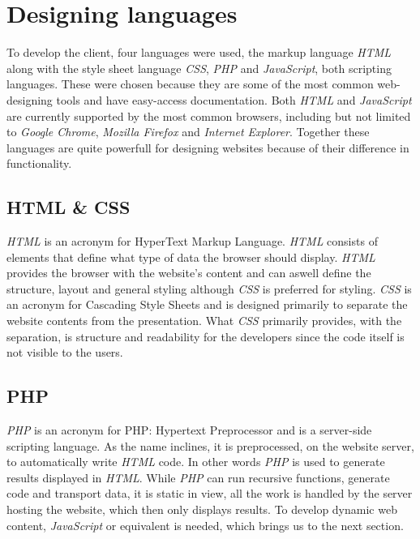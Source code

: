 \section{Designing languages}
To develop the client, four languages were used, the markup language \textit{HTML} along with the style sheet language \textit{CSS}, \textit{PHP} and \textit{JavaScript}, both scripting languages. These were chosen because they are some of the most common web-designing tools and have easy-access documentation. Both \textit{HTML} and \textit{JavaScript} are currently supported by the most common browsers, including but not limited to \textit{Google Chrome}, \textit{Mozilla Firefox} and \textit{Internet Explorer}.
Together these languages are quite powerfull for designing websites because of their difference in functionality.

\subsection{HTML \& CSS}
\label{program_tools_html_css}
\textit{HTML} is an acronym for HyperText Markup Language. \textit{HTML} consists of elements that define what type of data the browser should display. \textit{HTML} provides the browser with the website's content and can aswell define the structure, layout and general styling although \textit{CSS} is preferred for styling. \textit{CSS} is an acronym for Cascading Style Sheets and is designed primarily to separate the website contents from the presentation.
What \textit{CSS} primarily provides, with the separation, is structure and readability for the developers since the code itself is not visible to the users.\cite{html}\cite{css}

\subsection{PHP}
\textit{PHP} is an acronym for PHP: Hypertext Preprocessor and is a server-side scripting language. As the name inclines, it is preprocessed, on the website server, to automatically write \textit{HTML} code. In other words \textit{PHP} is used to generate results displayed in \textit{HTML}. While \textit{PHP} can run recursive functions, generate code and transport data, it is static in view, all the work is handled by the server hosting the website, which then only displays results. To develop dynamic web content, \textit{JavaScript} or equivalent is needed, which brings us to the next section.\cite{php}

